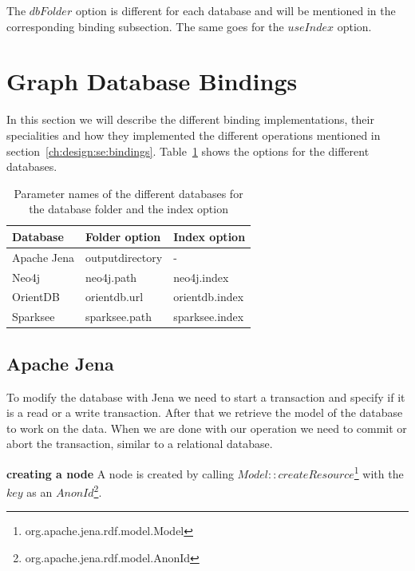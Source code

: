 The $ dbFolder $ option is different for each database and will be mentioned in the corresponding binding subsection.
The same goes for the $ useIndex $ option.

\section{Graph Database Bindings}
\label{ch:implementation:se:graphDatabaseBindings}
In this section we will describe the different binding implementations, their specialities and how they implemented the different operations mentioned in section~\ref{ch:design:se:bindings}.
Table~\ref{tab:bindingParameterMapping} shows the options for the different databases.

\begin{table}
  \begin{minipage}{\textwidth}
    \begin{tabularx}{\textwidth}{ | X | X | X | }
      \hline
      Database & Folder option & Index option \\ \hline \hline
      Apache Jena & outputdirectory & - \\ \hline
      Neo4j & neo4j.path & neo4j.index \\ \hline
      OrientDB & orientdb.url & orientdb.index \\ \hline
      Sparksee & sparksee.path & sparksee.index \\ \hline
    \end{tabularx}
  \end{minipage}
  \caption{Parameter names of the different databases for the database folder and the index option}
  \label{tab:bindingParameterMapping}
\end{table}

\subsection{Apache Jena}
To modify the database with Jena we need to start a transaction and specify if it is a read or a write transaction.
After that we retrieve the model of the database to work on the data.
When we are done with our operation we need to commit or abort the transaction,
similar to a relational database.

\textbf{creating a node} \newline
A node is created by calling $ Model::createResource $\footnote{org.apache.jena.rdf.model.Model} with the $ key $ as an $ AnonId $\footnote{org.apache.jena.rdf.model.AnonId}.

